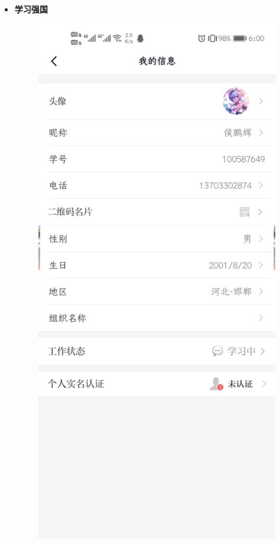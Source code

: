 \documentclass{article}
\begin{document}
\begin{itemize}
{\begin{figure}[h]
            \label{fig:1.3}
        \end{figure}
    }
    \item {
        \bf{学习强国}\\
        \begin{figure}[h]
            \centering
            \includegraphics[scale=0.1]{1.4}

\end{figure}}
\end{itemize}
\end{document}
